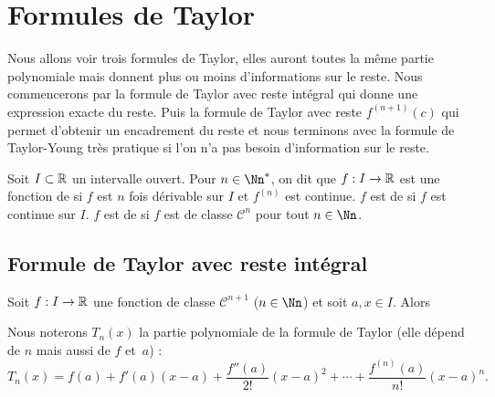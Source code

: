 \documentclass[class=report,crop=false]{standalone}
\begin{document}
\section{Formules de Taylor}


Nous allons voir trois formules de Taylor, elles auront toutes la même partie polynomiale
mais donnent plus ou moins d'informations sur le reste. Nous commencerons par la formule de
Taylor avec reste intégral qui donne une expression exacte du reste. Puis la formule de Taylor avec
reste $f^{(n+1)}(c)$ qui permet d'obtenir un encadrement du reste et nous terminons avec la formule de Taylor-Young
très pratique si l'on n'a pas besoin d'information sur le reste.

\bigskip

Soit $I \subset \mathbb{R}$ un intervalle ouvert. Pour $n \in \Nn^*$, on dit
que $f : I \to \mathbb{R}$ est une fonction de 
si $f$ est $n$ fois dérivable sur $I$ et $f^{(n)}$ est continue.
$f$ est de   si $f$ est continue sur $I$.
$f$ est de   si $f$ est de classe $\mathcal{C}^n$
pour tout $n\in\Nn$.





\subsection{Formule de Taylor avec reste intégral}

\begin{theoreme}
Soit $f : I\to\mathbb{R}$ une fonction de classe $\mathcal{C}^{n+1}$ ($n \in \Nn$)
et soit $a,x \in I$.
Alors
\end{theoreme}


Nous noterons $T_n(x)$ la partie polynomiale de la
formule de Taylor (elle dépend de $n$ mais aussi de $f$ et~$a$)  :
$$T_n(x) =f(a)+f'(a)(x-a)+\frac{f''(a)}{2!}(x-a)^2+\cdots
+\frac{f^{(n)}(a)}{n!}(x-a)^n.$$
\end{document}
